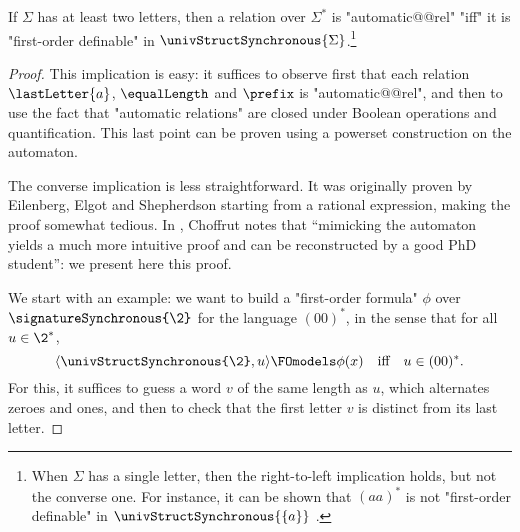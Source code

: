 \begin{proposition}
	\AP\label{prop:automatic-first-order}
	If $\Sigma$ has at least two letters, then a relation over $\Sigma^*$
	is "automatic@@rel" "iff" it is "first-order definable" in
	$\univStructSynchronous{\Sigma}$.\footnote{When $\Sigma$ has a single letter,
	then the right-to-left implication holds, but not the converse one.
	For instance, it can be shown that $(aa)^*$ is not "first-order definable"
	in $\univStructSynchronous{\{a\}}$ \cite[\S~9]{EilenbergElgotShepherdson1969TapeAutomata}.}
\end{proposition}

\begin{proof}
	This implication is easy: it suffices to observe first that each
	relation $\lastLetter{a}$, $\equalLength$ and $\prefix$ is "automatic@@rel",
	and then to use the fact that "automatic relations" are closed under
	Boolean operations and quantification. This last point can be proven
	using a powerset construction on the automaton.

	The converse implication is less straightforward. It was originally proven by
	Eilenberg, Elgot and Shepherdson starting from a rational expression, making
	the proof somewhat tedious.
	In \cite[\S~``1969'']{Choffrut2006Survey}, Choffrut notes that
	``mimicking the automaton yields a much
	more intuitive proof and can be reconstructed by a good PhD student'':
	we present here this proof.
	
	We start with an example: we want to build a "first-order formula" $\phi$ over $\signatureSynchronous{\2}$ for the language $(00)^*$, in the sense
	that for all $u\in \2^*$,
	\[
		\tup{\univStructSynchronous{\2}, u} \FOmodels \phi(x) \quad\text{iff}\quad u \in (00)^*.
	\]
	For this, it suffices to guess a word $v$ of the same length as $u$, which alternates
	zeroes and ones, and then to check that the first letter $v$ is distinct from
	its last letter.


\end{proof}
